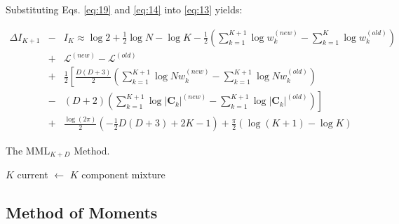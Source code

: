 \documentclass{elsarticle}
\newcommand{\nbb}[2]{
    \fcolorbox{black}{cyan}{\bfseries\sffamily\scriptsize#1}
    {\sf$\blacktriangleright$\textcolor{blue}{\textit{#2}}$\blacktriangleleft$}
}
\newcommand{\alda}[1]{\nbb{Aldeida}{#1}}
\newcommand{\vect}[1]{\boldsymbol{\mathbf{#1}}}
\def\veccov{\vect{C}}
\begin{document}
\noindent{}Substituting Eqs. \ref{eq:19} and \ref{eq:14} into \ref{eq:13} yields:

\begin{eqnarray}
\Delta{}I_{K+1} &-& I_K \approx \log{2} %
    + \frac{1}{2}\log{N} - \log{K} - \frac{1}{2}\left(\sum_{k=1}^{K+1}\log{w_k^{(new)}} - \sum_{k=1}^{K}\log{w_k^{(old)}}\right) \nonumber \\ %
& +& \mathcal{L}^{(new)} - \mathcal{L}^{(old)} \nonumber \\ %
& +& \frac{1}{2}\left[\frac{D(D+3)}{2}\left(\sum_{k=1}^{K+1}\log{Nw_k^{(new)} - \sum_{k=1}^{K+1}\log{Nw_k^{(old)}}} \right) \right.\nonumber \\
&-& \left.\left(D+2\right)\left(\sum_{k=1}^{K+1}\log{|\veccov_k|^{(new)}} - \sum_{k=1}^{K+1}\log{|\veccov_k|^{(old)}}\right)\right] \nonumber \\
& +& \frac{\log(2\pi)}{2}(-\frac{1}{2}D(D+3) + 2K  - 1) + \frac{\pi}{2}\left(\log{(K + 1)} - \log{K}\right)
\end{eqnarray}

\begin{algorithm}[H]
\caption{The MML$_{K+D}$ Method.}
\label{alg:MMLKD}
\begin{algorithmic}[1]
 $K$ 
\State current $\leftarrow$ $K$ component mixture
\EndWhile
{} 
\end{algorithmic}
\end{algorithm}

\subsection{Method of Moments}
%
%
%
%
%
%
\end{document}
